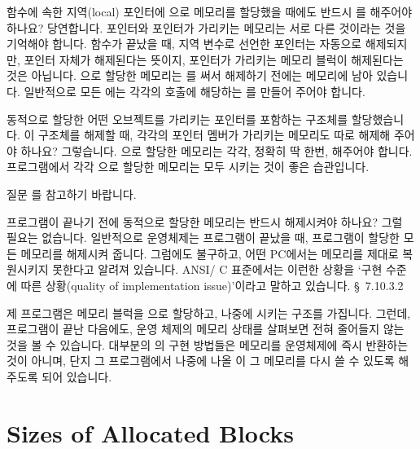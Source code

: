 \begin{faq}
	함수에 속한 지역(local) 포인터에 으로
	메모리를 할당했을 때에도 반드시 를 해주어야 하나요?
\A
	당연합니다.  포인터와 포인터가 가리키는 메모리는 서로 다른 것이라는
	것을 기억해야 합니다.  함수가 끝났을 때, 지역 변수로 선언한 포인터는
	자동으로 해제되지만, 포인터 자체가 해제된다는 뜻이지, 포인터가
	가리키는 메모리 블럭이 해제된다는 것은 아닙니다.
	으로 할당한 메모리는 를 써서 해제하기 전에는
	메모리에 남아 있습니다.  일반적으로 모든 에는 각각의
	호출에 해당하는 를 만들어 주어야 합니다.
\end{faq}

\begin{faq}
	동적으로 할당한 어떤 오브젝트를 가리키는 포인터를 포함하는
	구조체를 할당했습니다.  이 구조체를 해제할 때, 각각의 포인터 멤버가
	가리키는 메모리도 따로 해제해 주어야 하나요?
\A
	그렇습니다.  으로 할당한 메모리는 각각, 정확히
	딱 한번,  해주어야 합니다.  프로그램에서 각각
	으로 할당한 메모리는 모두 시키는 것이
	좋은 습관입니다.

	질문 를 참고하기 바랍니다.
\end{faq}

\begin{faq}
	프로그램이 끝나기 전에 동적으로 할당한 메모리는
	반드시 해제시켜야 하나요?
\A
	그럴 필요는 없습니다.  일반적으로 운영체제는 프로그램이 끝났을 때,
	프로그램이 할당한 모든 메모리를 해제시켜 줍니다.  그럼에도
	불구하고, 어떤 PC에서는 메모리를 제대로 복원시키지 못한다고
	알려져 있습니다.  ANSI/\cite{c89} C 표준에서는 이런한 상황을
	`구현 수준에 따른 상황(quality of implementation issue)'이라고
	말하고 있습니다.
\R
	\cite{c89} \S\ 7.10.3.2 \\
\end{faq}

\begin{faq}
	제 프로그램은 메모리 블럭을 으로 할당하고,
	나중에 시키는 구조를 가집니다.  그런데, 프로그램이 끝난
	다음에도, 운영 체제의 메모리 상태를 살펴보면 전혀 줄어들지 않는
	것을 볼 수 있습니다.
\A	대부분의 의 구현 방법들은 메모리를 운영체제에
	즉시 반환하는 것이 아니며, 단지 그 프로그램에서 나중에 나올 
	이	그 메모리를 다시 쓸 수 있도록 해 주도록 되어
	있습니다.
\end{faq}

\section{Sizes of Allocated Blocks}
%
%

